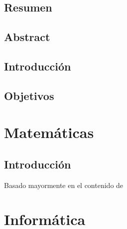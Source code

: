 \documentclass[a4paper,11pt]{report}
\begin{document}

\makeatletter
\makeatother


\chapter*{Resumen}
  
\chapter*{Abstract}
  

\tableofcontents

\break 

\setcounter{page}{1}

\makeatletter
\makeatother


\chapter*{Introducción}
  
\chapter*{Objetivos}
  
  
\part{Matemáticas}
\chapter{Introducción}
  Basado mayormente en el contenido de \cite{shwartz_understanding_ml}
  
  

\part{Informática}



\end{document}

